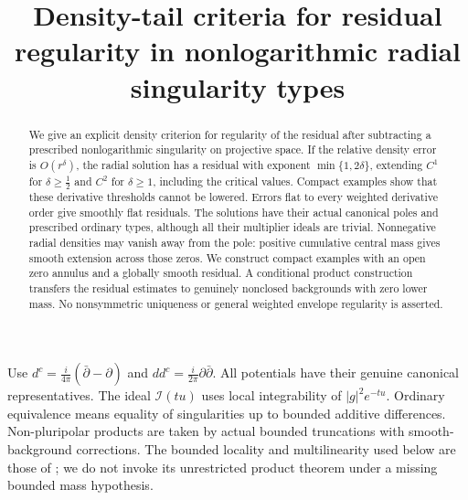 \documentclass[11pt]{article}
\title{Density-tail criteria for residual regularity\newline
in nonlogarithmic radial singularity types}
\author{}
\date{}
\newcommand{\ddc}{dd^c}
\newcommand{\I}{\mathcal I}
\theoremstyle{remark}\newtheorem{remark}[theorem]{Remark}
\begin{document}
\maketitle
\begin{abstract}
We give an explicit density criterion for regularity of the residual
after subtracting a prescribed nonlogarithmic singularity on projective
space. If the relative density error is $O(r^\delta)$, the radial
solution has a residual with exponent $\min\{1,2\delta\}$, extending
$C^1$ for $\delta\ge\frac12$ and $C^2$ for $\delta\ge1$, including
the critical values. Compact examples show that these derivative
thresholds cannot be lowered. Errors flat to every weighted derivative
order give smoothly flat residuals. The solutions have their actual
canonical poles and prescribed ordinary types, although all their
multiplier ideals are trivial. Nonnegative radial densities may vanish
away from the pole: positive cumulative central mass gives smooth
extension across those zeros. We construct compact examples with an
open zero annulus and a globally smooth residual. A conditional product construction
transfers the residual estimates to genuinely nonclosed backgrounds
with zero lower mass. No nonsymmetric uniqueness or general weighted
envelope regularity is asserted.
\end{abstract}

Use $d^c=\frac{i}{4\pi}(\bar\partial-\partial)$ and
$\ddc=\frac{i}{2\pi}\partial\bar\partial$.
All potentials have their genuine canonical representatives.
The ideal $\I(tu)$ uses local integrability of $|g|^2e^{-tu}$.
Ordinary equivalence means equality of singularities up to bounded
additive differences. Non-pluripolar products are taken by actual
bounded truncations with smooth-background corrections. The bounded
locality and multilinearity used below are those of
\cite[Section 2.1]{BGL}; we do not invoke its unrestricted product
theorem under a missing bounded mass hypothesis.
\end{document}
